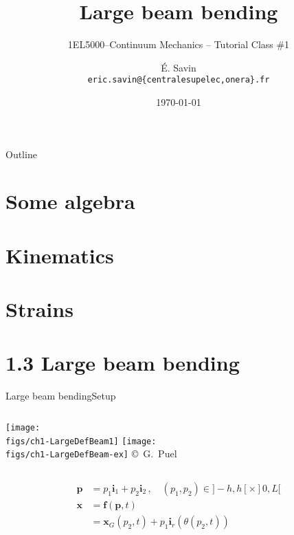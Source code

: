 \documentclass{beamer}
\title[1EL5000/S1]
{Large beam bending}
\subtitle{1EL5000--Continuum Mechanics -- Tutorial Class \#1} %
\author[\'E. Savin] %
{\'E. Savin\inst{1,2}\\ \scriptsize{\texttt{eric.savin@\{centralesupelec,onera\}.fr}}}%
\institute[Onera] %
{\inst{1}{Information Processing and Systems Dept.\\\Onera, France}
\and
 \inst{2}{Mechanical and Civil Engineering Dept.\\\ECP, France}}%
\date{\today}
\newcommand{\xj}{x}
\newcommand{\xv}{{\boldsymbol\xj}}
\renewcommand{\ij}{i}
\newcommand{\pj}{p}
\newcommand{\iv}{{\boldsymbol\ij}}
\newcommand{\pv}{{\boldsymbol\pj}}
\newcommand{\posij}{f}
\newcommand{\posiv}{{\boldsymbol\posij}}
\begin{document}
\begin{frame}
  \titlepage
\end{frame}

\begin{frame}{Outline}
  \tableofcontents
\end{frame}




\section{Some algebra}



\section{Kinematics}


\section{Strains}



\section{1.3 Large beam bending}

\begin{frame}{Large beam bending}{Setup}

\begin{columns}[t]
\centering\texttt{[image: \\figs/ch1-LargeDefBeam1]}
\vskip-145pt
\centering\texttt{[image: \\figs/ch1-LargeDefBeam-ex]}
\vskip-5pt{\hspace{3.2truecm}\mbox{\tiny{\copyright\ G. Puel}}}
\end{columns}
\begin{displaymath}
\begin{split}
\pv &=\pj_1\iv_1+\pj_2\iv_2\,,\quad(\pj_1,\pj_2)\in]-h,h[\times]0,L[ \\
\xv &=\posiv(\pv,t) \\
&=\xv_G(\pj_2,t)+\pj_1\iv_r(\theta(\pj_2,t))
\end{split}
\end{displaymath}

\end{frame}
\end{document}
